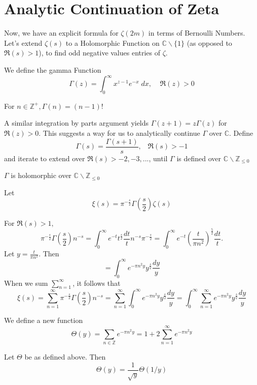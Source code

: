 \section{Analytic Continuation of Zeta}
Now, we have an explicit formula for $\zeta(2m)$ in terms of Bernoulli Numbers.
Let's extend $\zeta(s)$ to a Holomorphic Function on $\mathbb{C}\backslash\{1\}$ 
(as opposed to $\Re(s)>1$), to find odd negative values entries of $\zeta$.

\begin{definition}
    We define the gamma Function
    \[
        \Gamma(z) = \int_0^{\infty}x^{z-1}e^{-x}\; dx, \;\;\;\; \Re(z)>0    
    \]
\end{definition}
\begin{remark}
    For $n\in\mathbb{Z}^+, \Gamma(n) = (n-1)!$
\end{remark}
A similar integration by parts argument yields $\Gamma(z+1) = z\Gamma(z)$
for $\Re(z)>0$. This suggests a way for us to analytically continue $\Gamma$ over 
$\mathbb{C}$. Define 
\[
    \Gamma(s)=\frac{\Gamma(s+1)}{s}, \;\;\; \Re(s)> -1
\]
and iterate to extend over $\Re(s)>-2,-3,...$, until $\Gamma$ is defined over
$\mathbb{C}\backslash \mathbb{Z}_{\leq 0}$
\begin{claim}
    $\Gamma$ is holomorphic over $\mathbb{C}\backslash\mathbb{Z}_{\leq 0}$
\end{claim}
\begin{definition}
    Let 
    \[
        \xi(s) = \pi^{-\frac{s}{2}}\Gamma(\frac{s}{2})\zeta(s)
    \]
\end{definition}
For $\Re(s)>1,$
\[
    \pi^{-\frac{s}{2}}\Gamma(\frac{s}{2})n^{-s}=\int_0^{\infty}e^{-t}t^{\frac{s}{2}}\frac{dt}{t}n^{-s}\pi^{-\frac{s}{2}}        
    =\int_0^{\infty}e^{-t}(\frac{t}{\pi n^2})^{\frac{5}{2}}\frac{dt}{t}. 
\]
Let $y=\frac{t}{\pi n^2}$.
Then 
\[
    =\int_0^{\infty}e^{-\pi n^2y}y^{\frac{s}{2}}\frac{dy}{y}    
\]
When we sum $\sum_{n=1}^{\infty}$, it follows that 
\[
    \xi(s)=\sum_{n=1}^{\infty}\pi^{-\frac{s}{2}}\Gamma(\frac{s}{2})n^{-s}
    =\sum_{n=1}^{\infty}\int_0^{\infty}e^{-\pi n^2y}y^{\frac{s}{2}}\frac{dy}{y}
    =\int_0^{\infty}\sum_{n=1}^{\infty}e^{-\pi n^2 y}y^{\frac{s}{2}}\frac{dy}{y}
\]
\begin{definition}
    We define a new function
    \[
        \Theta(y) = \sum_{n\in\mathbb{Z}}e^{-\pi n^2y}=1+2\sum_{n=1}^{\infty}
        e^{-\pi n^2y}
    \]
\end{definition}
\begin{theorem}
    Let $\Theta$ be as defined above. Then 
    \[
        \Theta(y)=\frac{1}{\sqrt{y}}\Theta(1/y)
    \]
\end{theorem}
